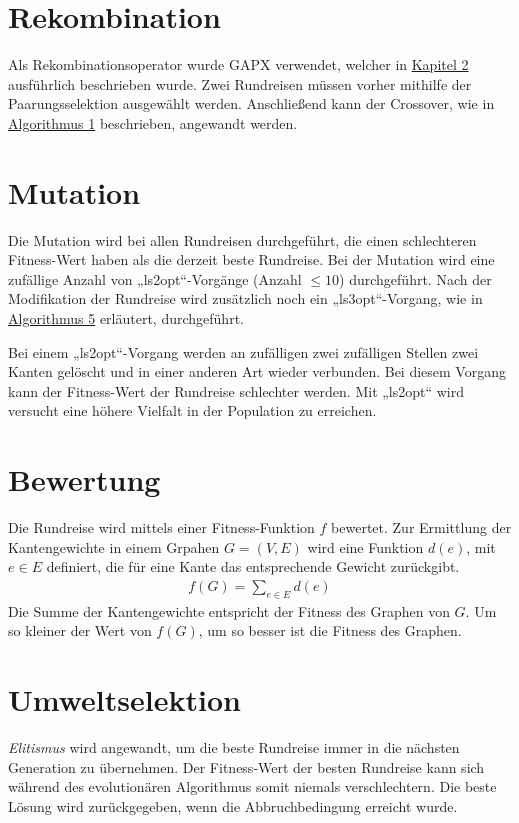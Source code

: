 \section{Rekombination}
Als Rekombinationsoperator wurde GAPX verwendet, welcher in
\hyperref[gapx_einleitung]{Kapitel 2}
ausführlich beschrieben wurde. Zwei Rundreisen müssen vorher mithilfe
der Paarungsselektion ausgewählt
werden. Anschließend kann der Crossover, wie in
\hyperref[alg:crossover_ea]{Algorithmus 1}
beschrieben, angewandt werden.
\section{Mutation}
Die Mutation wird bei allen Rundreisen durchgeführt, die einen
schlechteren Fitness-Wert haben als die derzeit beste Rundreise. 
Bei der Mutation wird eine zufällige Anzahl von „ls2opt“-Vorgänge
(Anzahl $\leq 10$) durchgeführt. Nach der Modifikation der Rundreise wird
zusätzlich noch ein „ls3opt“-Vorgang, wie in \hyperref[alg:ls3opt_run]{Algorithmus 5} 
erläutert, durchgeführt.

\begin{bem}
Bei einem „ls2opt“-Vorgang werden an zufälligen zwei zufälligen Stellen
zwei Kanten gelöscht und in einer anderen Art wieder verbunden. Bei
diesem Vorgang kann der Fitness-Wert der Rundreise schlechter werden.
Mit „ls2opt“ wird versucht eine höhere Vielfalt in der Population zu
erreichen.
\end{bem}

\section{Bewertung}
Die Rundreise wird mittels einer Fitness-Funktion $f$ bewertet.
Zur Ermittlung der Kantengewichte in einem Grpahen $G = (V, E)$ wird
eine Funktion $d(e)$, mit $e \in E$ definiert, die für eine Kante das
entsprechende Gewicht zurückgibt.
\begin{align*}
   f(G) = \sum_{e \in E} d(e)
\end{align*}
Die Summe der Kantengewichte entspricht der Fitness des Graphen von
$G$. Um so kleiner der Wert von $f(G)$, um so besser ist die Fitness des
Graphen.

\section{Umweltselektion}
\textit{Elitismus} wird angewandt,
um die beste Rundreise immer in die nächsten Generation zu übernehmen.
Der Fitness-Wert der besten Rundreise kann sich während des
evolutionären Algorithmus somit niemals verschlechtern. Die beste Lösung wird
zurückgegeben, wenn die Abbruchbedingung erreicht wurde.

